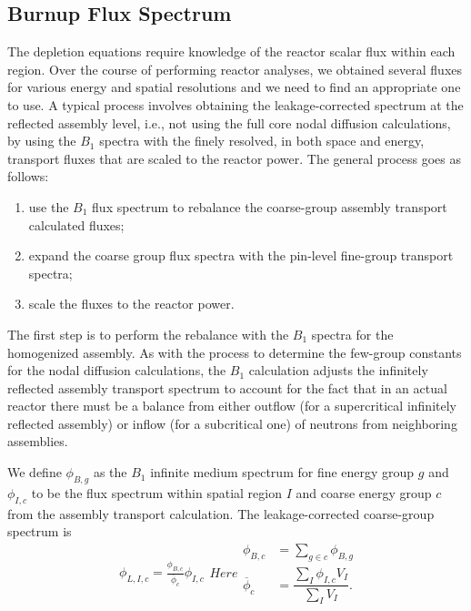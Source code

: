 \subsection{Burnup Flux Spectrum}

The depletion equations require knowledge of the reactor scalar flux within each region. Over the course of performing reactor analyses, we obtained several fluxes for various energy and spatial resolutions and we need to find an appropriate one to use. A typical process involves obtaining the leakage-corrected spectrum at the reflected assembly level, i.e., not using the full core nodal diffusion calculations, by using the $B_1$ spectra with the finely resolved, in both space and energy, transport fluxes that are scaled to the reactor power. The general process goes as follows:
\begin{enumerate}
  \item use the $B_1$ flux spectrum to rebalance the coarse-group assembly transport calculated fluxes;
  \item expand the coarse group flux spectra with the pin-level fine-group transport spectra;
  \item scale the fluxes to the reactor power.
\end{enumerate}

The first step is to perform the rebalance with the $B_1$ spectra for the homogenized assembly. As with the process to determine the few-group constants for the nodal diffusion calculations, the $B_1$ calculation adjusts the infinitely reflected assembly transport spectrum to account for the fact that in an actual reactor there must be a balance from either outflow (for a supercritical infinitely reflected assembly) or inflow (for a subcritical one) of neutrons from neighboring assemblies.

We define $\phi_{B,g}$ as the $B_1$ infinite medium spectrum for fine energy group $g$ and $\phi_{I,c}$ to be the flux spectrum within spatial region $I$ and coarse energy group $c$ from the assembly transport calculation. The leakage-corrected coarse-group spectrum is
\begin{subequations}
\begin{align}
  \phi_{L,I,c} = \frac{ \phi_{B,c} }{ \overline{\phi}_c } \phi_{I,c}
\end{align}
Here
\begin{align}
  \phi_{B,c} &= \sum_{g \in c} \phi_{B,g} \\
  \overline{\phi}_c &= \dfrac{ \displaystyle\sum_I \phi_{I,c} V_I }{ \displaystyle\sum_I V_I } .
\end{align}
\end{subequations}

